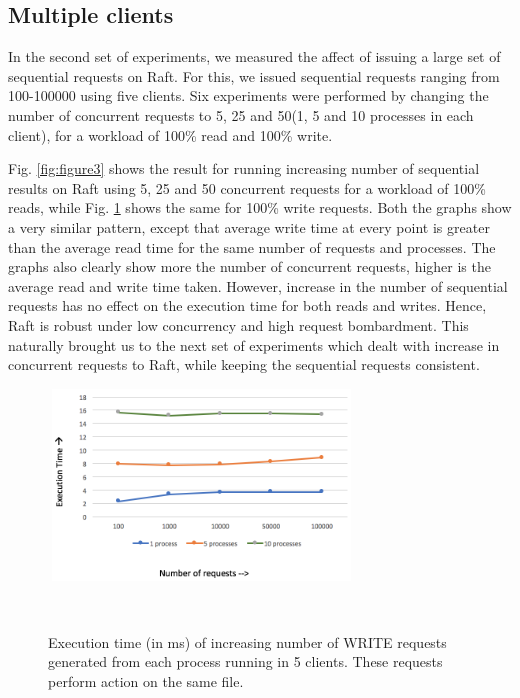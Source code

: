 \subsection{Multiple clients}

In the second set of experiments, we measured the affect of issuing a large set of sequential requests on Raft. For this, we issued sequential requests ranging from 100-100000 using five clients. Six experiments were performed by changing the number of concurrent requests to 5, 25 and 50(1, 5 and 10 processes in each client), for a workload of 100\% read and 100\% write.

Fig. \ref{fig:figure3} shows the result for running increasing number of sequential results on Raft using 5, 25 and 50 concurrent requests for a workload of 100\% reads, while Fig. \ref{fig:figure4} shows the same for 100\% write requests. Both the graphs show a very similar pattern, except that average write time at every point is greater than the average read time for the same number of requests and processes. The graphs also clearly show more the number of concurrent requests, higher is the average read and write time taken. However, increase in the number of sequential requests has no effect on the execution time for both reads and writes. Hence, Raft is robust under low concurrency and high request bombardment.
This naturally brought us to the next set of experiments which dealt with increase in concurrent requests to Raft, while keeping the sequential requests consistent.

\begin{figure}[h]
\centering
\includegraphics[height=2in, width=3.2in]{images/F-HC-SF-W.png}
\caption{Execution time (in ms) of increasing number of WRITE requests generated from each process running in 5 clients. These requests perform action on the same file.}~\label{fig:figure4}
\end{figure}


